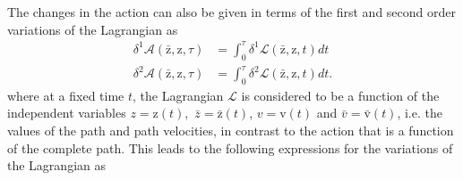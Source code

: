 \documentclass[aps,preprint]{revtex4}%
\begin{document}
The changes in the action can also be given in terms of the first and second
order variations of the Lagrangian as
\begin{align}
\delta^{1}\mathcal{A}\left(  \mathrm{\bar{z}},\mathrm{z}\mathbf{,}\tau\right)
&  =\int_{0}^{\tau}\delta^{1}\mathcal{L}\left(  \mathrm{\bar{z}}%
,\mathrm{z}\mathbf{,}t\right)  dt\nonumber\\
\delta^{2}\mathcal{A}\left(  \mathrm{\bar{z}},\mathrm{z}\mathbf{,}\tau\right)
&  =\int_{0}^{\tau}\delta^{2}\mathcal{L}\left(  \mathrm{\bar{z}}%
,\mathrm{z}\mathbf{,}t\right)  dt.
\end{align}
where at a fixed time $t$, the Lagrangian $\mathcal{L}$ is considered to be a
function of the independent variables $z=\mathrm{z}\left(  t\right)  ,$
$\bar{z}=\mathrm{\bar{z}}\left(  t\right)  $, $v=\mathrm{v}\left(  t\right)  $
and $\bar{v}=\mathrm{\bar{v}}\left(  t\right)  $, i.e. the values of the path
and path velocities, in contrast to the action that is a function of the
complete path. This leads to the following expressions for the variations of
the Lagrangian as
\end{document}
